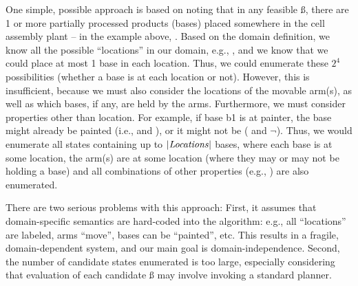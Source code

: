 One simple, possible approach %
is based on noting that 
in any feasible \ss, there are 1 or more partially processed
products (bases) placed somewhere in the cell assembly
plant -- in the example above, .
Based on the domain definition, we know all the possible
``locations'' in our domain, e.g., ,
and we know that we could place at most 1 base in each location. Thus,
we could enumerate these $2^{4}$ possibilities (whether a base is at
each location or not).
However, this is insufficient, because we must also consider the locations of the movable arm(s), as well as which bases, if any, are held by the arms.
Furthermore, we must consider properties other
than location. For example, if base b1 is at painter,
 the base might already be painted (i.e.,  and ), or it might not be ( and $\lnot$).
Thus, we would enumerate all states containing up to $|\mbox{\textit{Locations}}|$
bases, where each base is at some location, the arm(s) are at some
location (where they may or may not be holding a base) %
and all combinations of other properties (e.g., ) are also enumerated.

There are two serious problems with this approach:
First, %
it assumes that domain-specific semantics are hard-coded 
into the %
algorithm: %
e.g., all ``locations'' are labeled, arms ``move'', bases can
be ``painted'', etc.
This results in a fragile, domain-dependent system, and our main goal is domain-independence.
%
Second, the number of candidate states enumerated is too large,
especially considering that evaluation of each candidate \ss
may involve invoking a standard planner.


